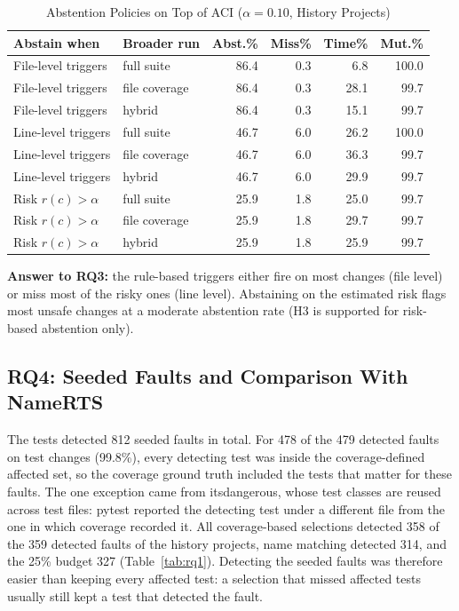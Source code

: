 \documentclass[conference]{IEEEtran}
\begin{document}
\begin{table}[t]
\caption{Abstention Policies on Top of ACI ($\alpha=0.10$, History Projects)}
\label{tab:rq3}
\centering
\footnotesize
\setlength{\tabcolsep}{2pt}
\begin{tabular}{@{}llrrrr@{}}
\toprule
\textbf{Abstain when} & \textbf{Broader run} & \textbf{Abst.\%} & \textbf{Miss\%} & \textbf{Time\%} & \textbf{Mut.\%} \\
\midrule
File-level triggers & full suite & 86.4 & 0.3 & 6.8 & 100.0 \\
File-level triggers & file coverage & 86.4 & 0.3 & 28.1 & 99.7 \\
File-level triggers & hybrid & 86.4 & 0.3 & 15.1 & 99.7 \\
\midrule
Line-level triggers & full suite & 46.7 & 6.0 & 26.2 & 100.0 \\
Line-level triggers & file coverage & 46.7 & 6.0 & 36.3 & 99.7 \\
Line-level triggers & hybrid & 46.7 & 6.0 & 29.9 & 99.7 \\
\midrule
Risk $r(c)>\alpha$ & full suite & 25.9 & 1.8 & 25.0 & 99.7 \\
Risk $r(c)>\alpha$ & file coverage & 25.9 & 1.8 & 29.7 & 99.7 \\
Risk $r(c)>\alpha$ & hybrid & 25.9 & 1.8 & 25.9 & 99.7 \\
\bottomrule
\end{tabular}
\end{table}

\textbf{Answer to RQ3:} the rule-based triggers either fire on most changes (file level) or miss most of the risky ones (line level). Abstaining on the estimated risk flags most unsafe changes at a moderate abstention rate (H3 is supported for risk-based abstention only).

\subsection{RQ4: Seeded Faults and Comparison With NameRTS}
The tests detected 812 seeded faults in total. For 478 of the 479 detected faults on test changes (99.8\%), every detecting test was inside the coverage-defined affected set, so the coverage ground truth included the tests that matter for these faults. The one exception came from itsdangerous, whose test classes are reused across test files: pytest reported the detecting test under a different file from the one in which coverage recorded it. All coverage-based selections detected 358 of the 359 detected faults of the history projects, name matching detected 314, and the 25\% budget 327 (Table~\ref{tab:rq1}). Detecting the seeded faults was therefore easier than keeping every affected test: a selection that missed affected tests usually still kept a test that detected the fault.
\end{document}
